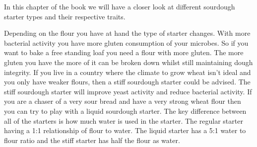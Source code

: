 In this chapter of the book we will have a closer look
at different sourdough starter types and their respective
traits.

\begin{table}[htp!]
\centering
{}
\caption{\label{tab:starter-types-comparison}A comparison of different sourdough starter types}
\end{table}

Depending on the flour you have at hand the type of starter changes. With more
bacterial activity you have more gluten consumption of your microbes. So if
you want to bake a free standing loaf you need a flour with more gluten. The
more gluten you have the more of it can be broken down whilst still maintaining
dough integrity. If you live in a country where the climate to grow wheat
isn't ideal and you only have weaker flours, then a stiff sourdough starter
could be advised. The stiff sourdough starter will improve yeast activity and
reduce bacterial activity. If you are a chaser of a very sour bread and have a
very strong wheat flour then you can try to play with a liquid sourdough
starter. The key difference between all of the starters is how much water
is used in the starter. The regular starter having a 1:1 relationship of flour
to water. The liquid starter has a 5:1 water to flour ratio and the stiff
starter has half the flour as water.

